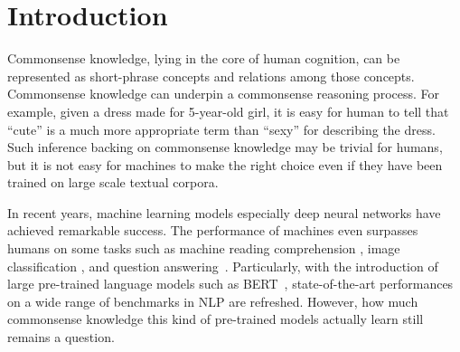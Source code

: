 \section{Introduction}

Commonsense knowledge, lying in the core of human cognition,
can be represented as short-phrase concepts and relations among those concepts. 
Commonsense knowledge can underpin a commonsense reasoning process. 
For example, given a dress made for 5-year-old girl, it is easy for human to 
tell that ``cute'' is a much more appropriate term than ``sexy'' for describing
the dress.  Such inference backing on commonsense knowledge may be 
trivial for humans, but it is not easy for %
machines to make the right choice even if they have been trained on 
large scale textual corpora.


In recent years, 
machine learning models especially deep neural networks have 
achieved remarkable success. 
The performance of machines even surpasses humans on some tasks
such as machine reading comprehension \cite{he2018dureader,rajpurkar2016squad,lai2017race}, image classification \cite{rajpurkar2017chexnet,deng2009imagenet}, and question answering~\cite{reddy2019coqa}.
Particularly, with the introduction of large pre-trained language models 
such as BERT~\cite{devlin2018bert}, 
state-of-the-art performances on a wide range of benchmarks in NLP are refreshed.
However, how much commonsense knowledge this kind of pre-trained models actually learn still remains a question.


